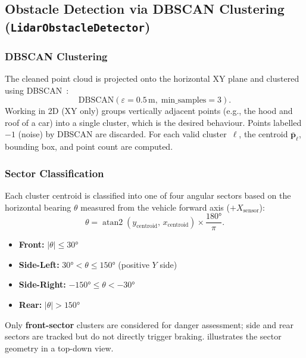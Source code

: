 \documentclass[12pt,a4paper]{article}
\begin{document}
\subsection{Obstacle Detection via DBSCAN Clustering
            (\texttt{LidarObstacleDetector})}
\label{subsec:lidar_dbscan}

\subsubsection{DBSCAN Clustering}

The cleaned point cloud is projected onto the horizontal XY plane and
clustered using DBSCAN~\cite{ester1996dbscan}:
\begin{equation}
  \text{DBSCAN}\!\left(\varepsilon = 0.5\,\text{m},\;
  \text{min\_samples} = 3\right).
  \label{eq:dbscan}
\end{equation}
Working in 2D (XY only) groups vertically adjacent points (e.g., the hood and
roof of a car) into a single cluster, which is the desired behaviour.  Points
labelled $-1$ (noise) by DBSCAN are discarded.  For each valid cluster~$\ell$,
the centroid $\bar{\mathbf{p}}_\ell$, bounding box, and point count are computed.

\subsubsection{Sector Classification}

Each cluster centroid is classified into one of four angular sectors based on
the horizontal bearing $\theta$ measured from the vehicle forward axis
($+X_{\text{sensor}}$):
\begin{equation}
  \theta = \operatorname{atan2}(y_{\text{centroid}},\, x_{\text{centroid}})
  \times \frac{180°}{\pi}.
  \label{eq:sector_angle}
\end{equation}

\begin{itemize}[nosep]
  \item \textbf{Front:} $|\theta| \le 30°$
  \item \textbf{Side-Left:} $30° < \theta \le 150°$ (positive $Y$ side)
  \item \textbf{Side-Right:} $-150° \le \theta < -30°$
  \item \textbf{Rear:} $|\theta| > 150°$
\end{itemize}

Only \textbf{front-sector} clusters are considered for danger assessment;
side and rear sectors are tracked but do not directly trigger braking.
 illustrates the sector geometry in a top-down view.
\end{document}
